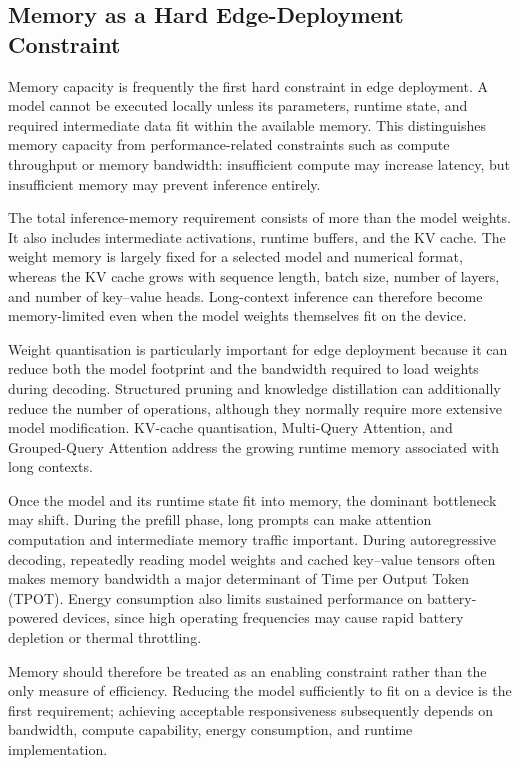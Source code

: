 \subsection{Memory as a Hard Edge-Deployment Constraint}
\label{subsec:edge-memory}

Memory capacity is frequently the first hard constraint in edge deployment. A 
model cannot be executed locally unless its parameters, runtime state, and 
required intermediate data fit within the available memory. This distinguishes 
memory capacity from performance-related constraints such as compute throughput 
or memory bandwidth: insufficient compute may increase latency, but insufficient 
memory may prevent inference entirely.

The total inference-memory requirement consists of more than the model weights. 
It also includes intermediate activations, runtime buffers, and the KV cache. 
The weight memory is largely fixed for a selected model and numerical format, 
whereas the KV cache grows with sequence length, batch size, number of layers, 
and number of key--value heads. Long-context inference can therefore become 
memory-limited even when the model weights themselves fit on the device.

Weight quantisation is particularly important for edge deployment because it 
can reduce both the model footprint and the bandwidth required to load weights 
during decoding. Structured pruning and knowledge distillation can additionally 
reduce the number of operations, although they normally require more extensive 
model modification. KV-cache quantisation, Multi-Query Attention, and 
Grouped-Query Attention address the growing runtime memory associated with long 
contexts.

Once the model and its runtime state fit into memory, the dominant bottleneck 
may shift. During the prefill phase, long prompts can make attention computation 
and intermediate memory traffic important. During autoregressive decoding, 
repeatedly reading model weights and cached key--value tensors often makes 
memory bandwidth a major determinant of Time per Output Token (TPOT). Energy 
consumption also limits sustained performance on battery-powered devices, since 
high operating frequencies may cause rapid battery depletion or thermal 
throttling.

Memory should therefore be treated as an enabling constraint rather than the 
only measure of efficiency. Reducing the model sufficiently to fit on a device 
is the first requirement; achieving acceptable responsiveness subsequently 
depends on bandwidth, compute capability, energy consumption, and runtime 
implementation.

